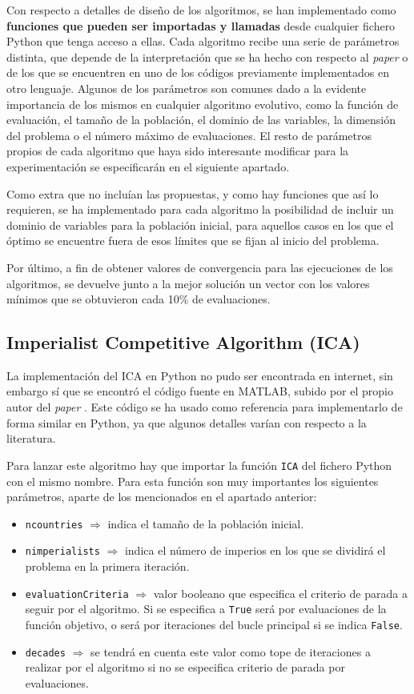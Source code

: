Con respecto a detalles de diseño de los algoritmos, se han implementado como \textbf{funciones que pueden ser importadas y llamadas} desde cualquier fichero Python que tenga acceso a ellas. Cada algoritmo recibe una serie de parámetros distinta, que depende de la interpretación que se ha hecho con respecto al \textit{paper} o de los que se encuentren en uno de los códigos previamente implementados en otro lenguaje. Algunos de los parámetros son comunes dado a la evidente importancia de los mismos en cualquier algoritmo evolutivo, como la función de evaluación, el tamaño de la población, el dominio de las variables, la dimensión del problema o el número máximo de evaluaciones. El resto de parámetros propios de cada algoritmo que haya sido interesante modificar para la experimentación se especificarán en el siguiente apartado.

Como extra que no incluían las propuestas, y como hay funciones que así lo requieren, se ha implementado para cada algoritmo la posibilidad de incluir un dominio de variables para la población inicial, para aquellos casos en los que el óptimo se encuentre fuera de esos límites que se fijan al inicio del problema.

Por último, a fin de obtener valores de convergencia para las ejecuciones de los algoritmos, se devuelve junto a la mejor solución un vector con los valores mínimos que se obtuvieron cada 10\% de evaluaciones.

\subsection{Imperialist Competitive Algorithm (ICA)}

La implementación del ICA en Python no pudo ser encontrada en internet, sin embargo sí que se encontró el código fuente en MATLAB, subido por el propio autor del \textit{paper} \cite{ica-matlab}. Este código se ha usado como referencia para implementarlo de forma similar en Python, ya que algunos detalles varían con respecto a la literatura.

Para lanzar este algoritmo hay que importar la función \texttt{ICA} del fichero Python con el mismo nombre. Para esta función son muy importantes los siguientes parámetros, aparte de los mencionados en el apartado anterior:

\begin{itemize}
	\item \texttt{ncountries} $\Rightarrow$ indica el tamaño de la población inicial.
	\item \texttt{nimperialists} $\Rightarrow$ indica el número de imperios en los que se dividirá el problema en la primera iteración.
	\item \texttt{evaluationCriteria} $\Rightarrow$ valor booleano que especifica el criterio de parada a seguir por el algoritmo. Si se especifica a \texttt{True} será por evaluaciones de la función objetivo, o será por iteraciones del bucle principal si se indica \texttt{False}.
	\item \texttt{decades} $\Rightarrow$ se tendrá en cuenta este valor como tope de iteraciones a realizar por el algoritmo si no se especifica criterio de parada por evaluaciones.
\end{itemize}

